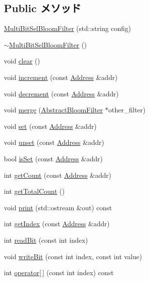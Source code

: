 \subsection*{Public メソッド}
\begin{DoxyCompactItemize}
\item 
\hyperlink{classMultiBitSelBloomFilter_a348622e24bbf3a3a8094c7780d5f13ba}{MultiBitSelBloomFilter} (std::string config)
\item 
\hyperlink{classMultiBitSelBloomFilter_ab58bb7c83be47e72d11876ae2636ab1e}{$\sim$MultiBitSelBloomFilter} ()
\item 
void \hyperlink{classMultiBitSelBloomFilter_ac8bb3912a3ce86b15842e79d0b421204}{clear} ()
\item 
void \hyperlink{classMultiBitSelBloomFilter_a3e860ad851b771ac3b6eeb1716eb56bc}{increment} (const \hyperlink{classAddress}{Address} \&addr)
\item 
void \hyperlink{classMultiBitSelBloomFilter_addb6b805abb8328082a24926f2bf8c84}{decrement} (const \hyperlink{classAddress}{Address} \&addr)
\item 
void \hyperlink{classMultiBitSelBloomFilter_a4091f5f95de040d4e0ae5bd86817b13c}{merge} (\hyperlink{classAbstractBloomFilter}{AbstractBloomFilter} $\ast$other\_\-filter)
\item 
void \hyperlink{classMultiBitSelBloomFilter_a2b666fae2a5c2b98bc5cba8e1333bcc9}{set} (const \hyperlink{classAddress}{Address} \&addr)
\item 
void \hyperlink{classMultiBitSelBloomFilter_a69b772787ea61467af679e3aa5406b41}{unset} (const \hyperlink{classAddress}{Address} \&addr)
\item 
bool \hyperlink{classMultiBitSelBloomFilter_a4200ee289c3d941a4b209c4788f8087c}{isSet} (const \hyperlink{classAddress}{Address} \&addr)
\item 
int \hyperlink{classMultiBitSelBloomFilter_abb722634d5846105b673e9496df8d062}{getCount} (const \hyperlink{classAddress}{Address} \&addr)
\item 
int \hyperlink{classMultiBitSelBloomFilter_a97f66183ea41a7c123bab9dd5313a74a}{getTotalCount} ()
\item 
void \hyperlink{classMultiBitSelBloomFilter_ac55fe386a101fbae38c716067c9966a0}{print} (std::ostream \&out) const 
\item 
int \hyperlink{classMultiBitSelBloomFilter_a19f42f6f2fc3501021b768f0df8108b2}{getIndex} (const \hyperlink{classAddress}{Address} \&addr)
\item 
int \hyperlink{classMultiBitSelBloomFilter_a6f8a98d0f38a8d122d4cbf87323484eb}{readBit} (const int index)
\item 
void \hyperlink{classMultiBitSelBloomFilter_ac188318778d26b44f567c5b530598c16}{writeBit} (const int index, const int value)
\item 
int \hyperlink{classMultiBitSelBloomFilter_ad7ab71ad11e6bca06c3534af5707d8fc}{operator\mbox{[}$\,$\mbox{]}} (const int index) const 
\end{DoxyCompactItemize}
